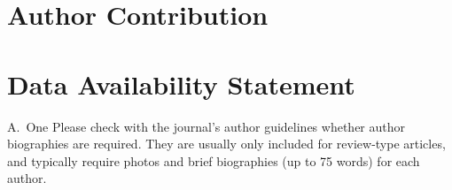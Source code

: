 \documentclass[alpha-refs]{wiley-article}
\begin{document}
\section*{Author Contribution}

\section*{Data Availability Statement}

\printendnotes



\begin{biography}{A.~One}
Please check with the journal's author guidelines whether author biographies are required. They are usually only included for review-type articles, and typically require photos and brief biographies (up to 75 words) for each author.
\bigskip
\bigskip
\end{biography}

\end{document}
